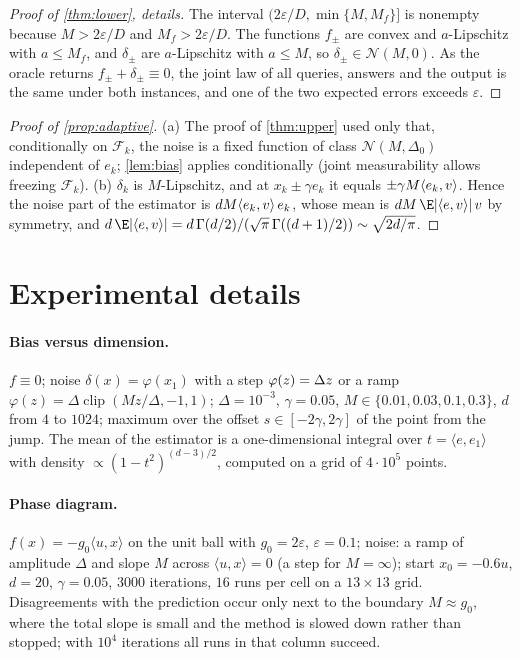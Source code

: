 \documentclass{article} %
\renewcommand{\eps}{\varepsilon}
\newcommand{\cN}{\mathcal{N}}
\newcommand{\cF}{\mathcal{F}}
\newcommand{\ip}[2]{\langle #1,#2\rangle}
\let\sign\relax\DeclareMathOperator{\sign}{sign}
\DeclareMathOperator{\clip}{clip}
\theoremstyle{plain}
\theoremstyle{definition}
\theoremstyle{remark}
\begin{document}
\begin{proof}[Proof of \cref{thm:lower}, details]
The interval $(2\eps/D,\min\{M,M_f\}]$ is nonempty because $M>2\eps/D$ and $M_f>2\eps/D$. The functions $f_\pm$ are convex and $a$-Lipschitz with $a\le M_f$, and $\delta_\pm$ are $a$-Lipschitz with $a\le M$, so $\delta_\pm\in\cN(M,0)$. As the oracle returns $f_\pm+\delta_\pm\equiv0$, the joint law of all queries, answers and the output is the same under both instances, and one of the two expected errors exceeds $\eps$.
\end{proof}

\begin{proof}[Proof of \cref{prop:adaptive}]
(a) The proof of \cref{thm:upper} used only that, conditionally on $\cF_k$, the noise is a fixed function of class $\cN(M,\Delta_0)$ independent of $e_k$; \cref{lem:bias} applies conditionally (joint measurability allows freezing $\cF_k$). (b) $\delta_k$ is $M$-Lipschitz, and at $x_k\pm\gamma e_k$ it equals $\pm\gamma M\sign\ip{e_k}v$. Hence the noise part of the estimator is $dM\sign\ip{e_k}v\,e_k$, whose mean is $dM\,\E|\ip ev|\,v$ by symmetry, and $d\,\E|\ip ev|=d\,\Gamma(d/2)/(\sqrt\pi\,\Gamma((d+1)/2))\sim\sqrt{2d/\pi}$.
\end{proof}

\section{Experimental details}\label{app:experiments}

\paragraph{Bias versus dimension.} $f\equiv0$; noise $\delta(x)=\varphi(x_1)$ with a step $\varphi(z)=\Delta\sign z$ or a ramp $\varphi(z)=\Delta\clip(Mz/\Delta,-1,1)$; $\Delta=10^{-3}$, $\gamma=0.05$, $M\in\{0.01,0.03,0.1,0.3\}$, $d$ from $4$ to $1024$; maximum over the offset $s\in[-2\gamma,2\gamma]$ of the point from the jump. The mean of the estimator is a one-dimensional integral over $t=\ip{e}{e_1}$ with density $\propto(1-t^2)^{(d-3)/2}$, computed on a grid of $4\cdot10^5$ points.

\paragraph{Phase diagram.} $f(x)=-g_0\ip ux$ on the unit ball with $g_0=2\eps$, $\eps=0.1$; noise: a ramp of amplitude $\Delta$ and slope $M$ across $\ip ux=0$ (a step for $M=\infty$); start $x_0=-0.6u$, $d=20$, $\gamma=0.05$, $3000$ iterations, $16$ runs per cell on a $13\times13$ grid. Disagreements with the prediction occur only next to the boundary $M\approx g_0$, where the total slope is small and the method is slowed down rather than stopped; with $10^4$ iterations all runs in that column succeed.
\end{document}
